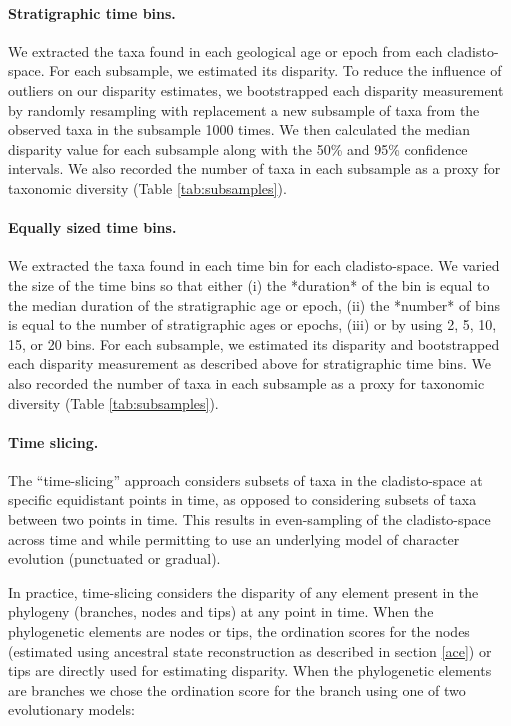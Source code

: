 \documentclass[12pt,a4paper]{article}
\begin{document}
\paragraph{Stratigraphic time bins.}
We extracted the taxa found in each geological age or epoch from each cladisto-space.
For each subsample, we estimated its disparity.
To reduce the influence of outliers on our disparity estimates, we bootstrapped each disparity measurement by randomly resampling with replacement a new subsample of taxa from the observed taxa in the subsample 1000 times.
We then calculated the median disparity value for each subsample along with the 50\% and 95\% confidence intervals.
We also recorded the number of taxa in each subsample as a proxy for taxonomic diversity (Table \ref{tab:subsamples}).

\paragraph{Equally sized time bins.}
We extracted the taxa found in each time bin for each cladisto-space.
We varied the size of the time bins so that either (i) the *duration* of the bin is equal to the median duration of the stratigraphic age or epoch, (ii) the *number* of bins is equal to the number of stratigraphic ages or epochs, (iii) or by using 2, 5, 10, 15, or 20 bins.
For each subsample, we estimated its disparity and bootstrapped each disparity measurement as described above for stratigraphic time bins.
We also recorded the number of taxa in each subsample as a proxy for taxonomic diversity (Table \ref{tab:subsamples}).

\paragraph{Time slicing.} %
The ``time-slicing'' approach considers subsets of taxa in the cladisto-space at specific equidistant points in time, as opposed to considering subsets of taxa between two points in time.
This results in even-sampling of the cladisto-space across time and while permitting to use an underlying model of character evolution (punctuated or gradual). %

In practice, time-slicing considers the disparity of any element present in the phylogeny (branches, nodes and tips) at any point in time.
When the phylogenetic elements are nodes or tips, the ordination scores for the nodes (estimated using ancestral state reconstruction as described in section \ref{ace}) or tips are directly used for estimating disparity.
When the phylogenetic elements are branches we chose the ordination score for the branch using one of two evolutionary models:
\end{document}
